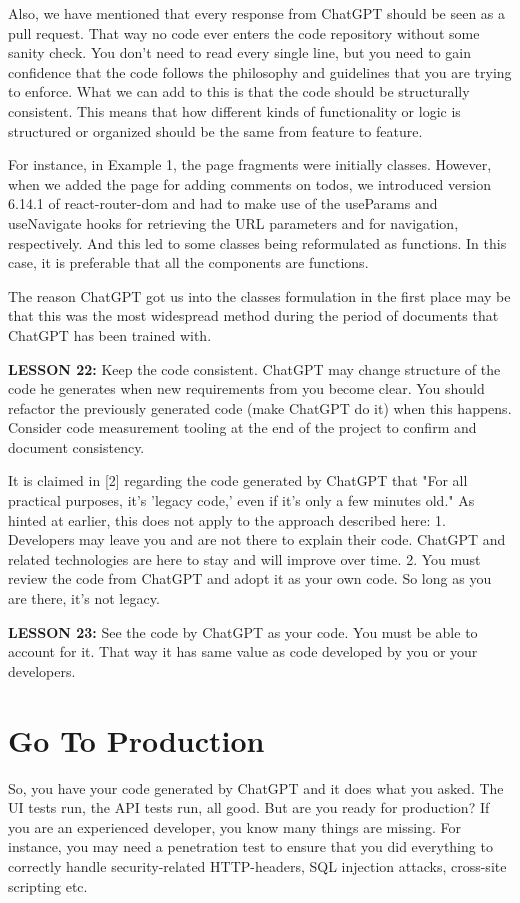 \documentclass[runningheads]{llncs}
\begin{document}
Also, we have mentioned that every response from ChatGPT should be seen as a pull request. That way no code ever enters the code repository without some sanity check. You don't need to read every single line, but you need to gain confidence that the code follows the philosophy and guidelines that you are trying to enforce. What we can add to this is that the code should be structurally consistent. This means that how different kinds of functionality or logic is structured or organized should be the same from feature to feature.
  
 For instance, in Example 1, the page fragments were initially classes. However, when we added the page for adding comments on todos, we introduced version 6.14.1 of react-router-dom and had to make use of the useParams and useNavigate hooks for retrieving the URL parameters and for navigation, respectively. And this led to some classes being reformulated as functions. In this case, it is preferable that all the components are functions.

The reason ChatGPT got us into the classes formulation in the first place may be that this was the most widespread method during the period of documents that ChatGPT has 
been trained with.

\textbf{LESSON 22:} Keep the code consistent. ChatGPT may change structure of the code he generates when new requirements from you become clear. You should refactor the previously generated code (make ChatGPT do it) when this happens. Consider code measurement tooling at the end of the project to confirm and document consistency.

It is claimed in [2] regarding the code generated by ChatGPT that "For all practical purposes, it's 'legacy code,' even if it's only a few minutes old." As hinted at earlier, this does not apply to the approach described here:
1. Developers may leave you and are not there to explain their code. ChatGPT and related technologies are here to stay and will improve over time.
2. You must review the code from ChatGPT and adopt it as your own code. So long as you are there, it's not legacy.

\textbf{LESSON 23:} See the code by ChatGPT as your code. You must be able to account for it. That way it has same value as code developed by you or your developers.

\section{Go To Production}
So, you have your code generated by ChatGPT and it does what you asked. The UI tests run, the API tests run, all good. But are you ready for production?
If you are an experienced developer, you know many things are missing. For instance, you may need a penetration test to ensure that you did everything to correctly handle 
security-related HTTP-headers, SQL injection attacks, cross-site scripting etc.
\end{document}
